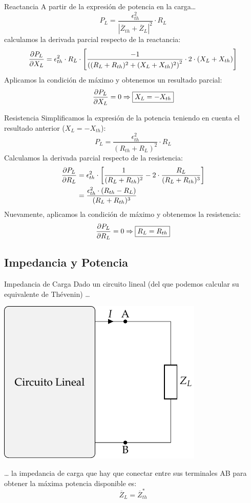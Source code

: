 \documentclass[aspectratio=169, usenames,svgnames,dvipsnames]{beamer}
\begin{document}
\begin{frame}[label={sec:org4c919d9}]{Reactancia}
A partir de la expresión de potencia en la carga\ldots{}
\[
  P_L = \frac{\epsilon^2_{th}}{|\overline{Z}_{th} + \overline{Z}_L|^2} \cdot R_L
\]
calculamos la derivada parcial respecto de la reactancia:
\[
  \diffp{P_L}{X_L} = \epsilon^2_{th} \cdot R_L \cdot \left[\frac{-1}{\left((R_L + R_{th})^2 + (X_L + X_{th})^2\right)^2} \cdot 2 \cdot (X_L + X_{th})\right]
\]
Aplicamos la condición de máximo y obtenemos un resultado parcial:
\[
   \diffp{P_L}{X_L} = 0 \Rightarrow \boxed{X_L = - X_{th}}
\]
\end{frame}

\begin{frame}[label={sec:org094e0f8}]{Resistencia}
Simplificamos la expresión de la potencia teniendo en cuenta el resultado anterior (\(X_L = - X_{th}\)):
\[
  P_L = \frac{\epsilon^2_{th}}{(R_{th} + R_L)^2} \cdot R_L
\]
Calculamos la derivada parcial respecto de la resistencia:
\begin{align*}
  \diffp{P_L}{R_L} &= \epsilon^2_{th} \cdot \left[\frac{1}{(R_L + R_{th})^2} - 2 \cdot \frac{R_L}{(R_L + R_{th})^3}\right]\\
		   &= \frac{\epsilon^2_{th} \cdot (R_{th} - R_L)}{(R_L + R_{th})^3}
\end{align*}
Nuevamente, aplicamos la condición de máximo y obtenemos la resistencia:
\[
   \diffp{P_L}{R_L} = 0 \Rightarrow \boxed{R_L = R_{th}}
\]
\end{frame}


\subsection{Impedancia y Potencia}
\label{sec:org1632c15}

\begin{frame}[label={sec:orgbdd03f1}]{Impedancia de Carga}
Dado un circuito lineal (del que podemos calcular su equivalente de Thévenin) \ldots{}
\begin{center}
\includegraphics[height=0.45\textheight]{../figs/CircuitoLineal_ZL.pdf}
\end{center}

\ldots{} la impedancia de carga que hay que conectar entre sus terminales AB para obtener la máxima potencia disponible es:
\[
  \boxed{\overline{Z}_L = \overline{Z}_{th}^*}
\]
\end{frame}
\end{document}
